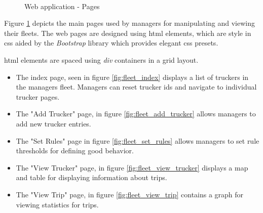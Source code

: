 \begin{figure}
{        \label{fig:fleet_view_trucker}
    }\\
\caption{Web application - Pages}
\label{fig:web_app_pages}
\end{figure}

Figure \ref{fig:web_app_pages} depicts the main pages used by managers for manipulating and viewing their fleets.
The web pages are designed using \ac{html} elements, which are style in \ac{css} aided by the \textit{Bootstrap} library which provides elegant \ac{css} presets.

\Ac{html} elements are spaced using \textit{div} containers in a grid layout.

\begin{itemize}
\item The index page, seen in figure \ref{fig:fleet_index} displays a list of truckers in the managers fleet. Managers can reset trucker \ac{id}s and navigate to individual trucker pages.
\item The "Add Trucker" page, in figure \ref{fig:fleet_add_trucker} allows managers to add new trucker entries.
\item The "Set Rules" page in figure \ref{fig:fleet_set_rules} allows managers to set rule thresholds for defining good behavior.
\item The "View Trucker" page, in figure \ref{fig:fleet_view_trucker} displays a map and table for displaying information about trips.
\item The "View Trip" page, in figure \ref{fig:fleet_view_trip} contains a graph for viewing statistics for trips.
\end{itemize}

\pagebreak
